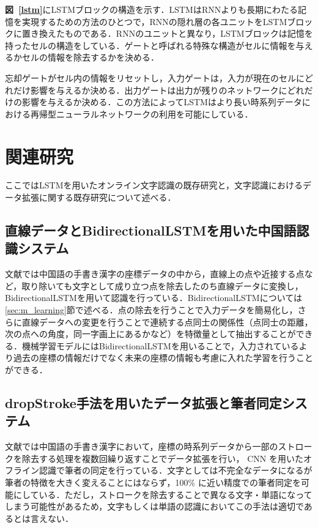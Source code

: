 \textbf{図~\ref{lstm}}にLSTMブロックの構造を示す．LSTMはRNNよりも長期にわたる記憶を実現するための方法のひとつで，RNNの隠れ層の各ユニットをLSTMブロックに置き換えたものである．RNNのユニットと異なり，LSTMブロックは記憶を持ったセルの構造をしている．ゲートと呼ばれる特殊な構造がセルに情報を与えるかセルの情報を除去するかを決める．

忘却ゲートがセル内の情報をリセットし，入力ゲートは，入力が現在のセルにどれだけ影響を与えるか決める．出力ゲートは出力が残りのネットワークにどれだけの影響を与えるか決める．この方法によってLSTMはより長い時系列データにおける再帰型ニューラルネットワークの利用を可能にしている．

\section{関連研究}
\label{sec:rel_3}
ここではLSTMを用いたオンライン文字認識の既存研究と，文字認識におけるデータ拡張に関する既存研究について述べる．

\subsection{直線データとBidirectionalLSTMを用いた中国語認識システム\cite{zhang18:drawing}}
\label{ssec:drawing}
文献\cite{zhang18:drawing}では中国語の手書き漢字の座標データの中から，直線上の点や近接する点など，取り除いても文字として成り立つ点を除去したのち直線データに変換し，BidirectionalLSTMを用いて認識を行っている．BidirectionalLSTMについては\ref{sec:m_learning}節で述べる．点の除去を行うことで入力データを簡易化し，さらに直線データへの変更を行うことで連続する点同士の関係性（点同士の距離，次の点への角度，同一字画上にあるかなど）を特徴量として抽出することができる．機械学習モデルにはBidirectionalLSTMを用いることで，入力されているより過去の座標の情報だけでなく未来の座標の情報も考慮に入れた学習を行うことができる．

\subsection{dropStroke手法を用いたデータ拡張と筆者同定システム\cite{yang15:dropstroke}}
文献\cite{yang15:dropstroke}では中国語の手書き漢字において，座標の時系列データから一部のストロークを除去する処理を複数回繰り返すことでデータ拡張を行い， CNN を用いたオフライン認識で筆者の同定を行っている．文字としては不完全なデータになるが筆者の特徴を大きく変えることにはならず，100\% に近い精度での筆者同定を可能にしている．ただし，ストロークを除去することで異なる文字・単語になってしまう可能性があるため，文字もしくは単語の認識においてこの手法は適切であるとは言えない．

